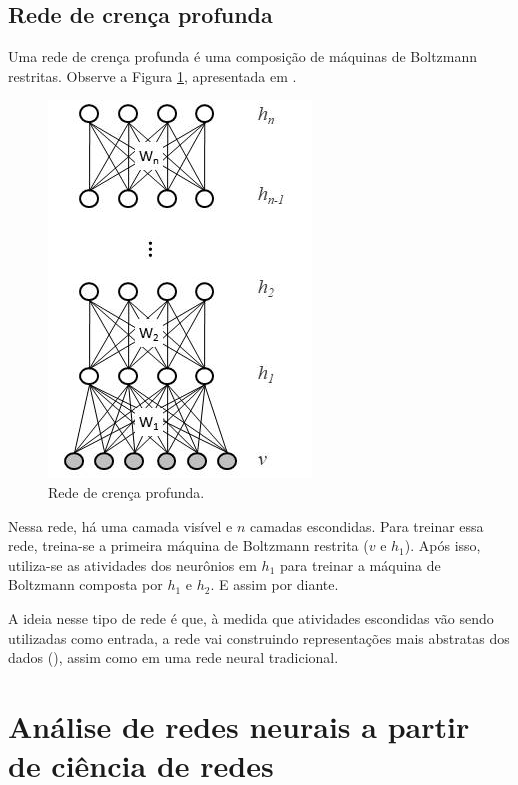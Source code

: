 \documentclass{article}
\begin{document}
        \subsection{Rede de crença profunda}

            Uma rede de crença profunda é uma composição de máquinas de Boltzmann restritas. Observe a Figura \ref{fig4}, apresentada em \cite{testolin2018deep}.

            \begin{figure}[h!]
                \centering
                \includegraphics[scale=0.5]{Images/Deep belief network.png}
                \caption{Rede de crença profunda.}
                \label{fig4}
            \end{figure}

            Nessa rede, há uma camada visível e $n$ camadas escondidas.
            Para treinar essa rede, treina-se a primeira máquina de Boltzmann restrita ($v$ e $h_1$).
            Após isso, utiliza-se as atividades dos neurônios em $h_1$ para treinar a máquina de Boltzmann composta por $h_1$ e $h_2$.
            E assim por diante.

            A ideia nesse tipo de rede é que, à medida que atividades escondidas vão sendo utilizadas como entrada, a rede vai construindo representações mais abstratas dos dados (\cite{testolin2018deep}), assim como em uma rede neural tradicional.

    \section{Análise de redes neurais a partir de ciência de redes}
            \label{analysis}
\end{document}
